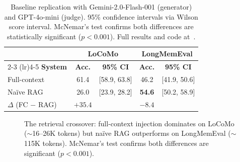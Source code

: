 \begin{table}[!t]
\centering
\caption{Baseline replication with Gemini-2.0-Flash-001 (generator) and
GPT-4o-mini (judge).  95\% confidence intervals via Wilson score interval.
McNemar's test confirms both differences are statistically significant
($p < 0.001$).  Full results and code at~\cite{alaya2026}.}
\label{tab:our-baselines}
\small
\begin{tabular}{@{}lcccc@{}}
\toprule
& \multicolumn{2}{c}{\textbf{LoCoMo}} & \multicolumn{2}{c}{\textbf{LongMemEval}} \\
\cmidrule(lr){2-3} \cmidrule(lr){4-5}
\textbf{System} & \textbf{Acc.} & \textbf{95\% CI} & \textbf{Acc.} & \textbf{95\% CI} \\
\midrule
Full-context & 61.4 & [58.9, 63.8] & 46.2 & [41.9, 50.6] \\
Na\"ive RAG  & 26.0 & [23.9, 28.2] & \textbf{54.6} & [50.2, 58.9] \\
\midrule
$\Delta$ (FC $-$ RAG) & $+35.4$ & & $-8.4$ & \\
\bottomrule
\end{tabular}
\end{table}

\begin{figure}[!t]
\centering
{}
\caption{The retrieval crossover: full-context injection dominates on
LoCoMo (${\sim}$16--26K tokens) but na\"ive RAG outperforms on
LongMemEval (${\sim}$115K tokens).  McNemar's test confirms both
differences are significant ($p < 0.001$).}
\label{fig:crossover}
\end{figure}


